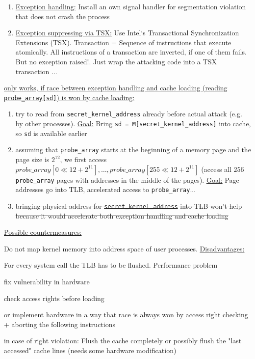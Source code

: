 \documentclass[landscape, a4paper]{article}
\begin{document}
\begin{minipage}[t]{0.2\pagewidth}
\begin{betterlist}
\begin{enumerate}
			\item \underline{Exception handling:} Install an own signal handler for segmentation violation that does not crash the process
			\item \underline{Exception suppressing via TSX:} Use Intel‘s Transactional Synchronization Extensions (TSX). Transaction = Sequence of instructions that execute atomically. All instructions of a transaction are inverted, if one of them fails. But no exception raised!. Just wrap the attacking code into a TSX transaction ...
		\end{enumerate}
		\item \uline{only works, if race between exception handling and cache loading (reading \texttt{probe\_array[sd]}) is won by cache loading:}
		\begin{enumerate}
			\item try to read from \verb|secret_kernel_address| already before actual attack (e.g. by other processes). \underline{Goal:} Bring \verb|sd = M[secret_kernel_address]| into cache, so \verb|sd| is available earlier
			\item assuming that \verb|probe_array| starts at the beginning of a memory page and the page size is $2^{12}$, we first access $probe\_array[0 \ll 12 + 2^{11}], \ldots, probe\_array[255 \ll 12 + 2^{11}]$ (access all $256$ \verb|probe_array| pages with addresses in the middle of the pages). \underline{Goal:} Page addresses go into TLB, accelerated access to \verb|probe_array|...
			\item \sout{bringing physical address for \texttt{secret\_kernel\_address} into TLB won't help because it would accelerate both exception handling and cache loading}
		\end{enumerate}
		\item \underline{Possible countermeasures:}
		\begin{betterlist}
			\item Do not map kernel memory into address space of user processes. \underline{Disadvantages:}
			\begin{betterlist}
				\item For every system call the TLB has to be flushed. Performance problem
			\end{betterlist}
			\item fix vulnerability in hardware
			\begin{betterlist}
				\item check access rights before loading
				\item or implement hardware in a way that race is always won by access right checking + aborting the following instructions
				\item in case of right violation: Flush the cache completely or possibly flush the "last accessed" cache lines (needs some hardware modification)
			\end{betterlist}
		\end{betterlist}
	\end{betterlist}
\end{minipage}
\end{document}

